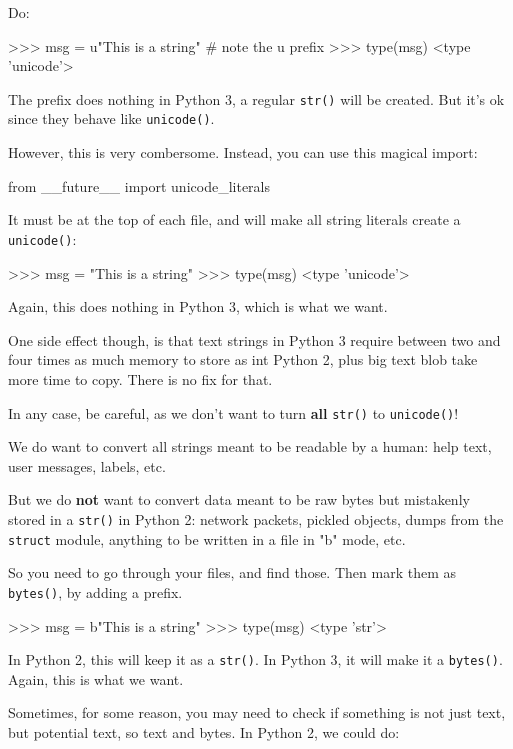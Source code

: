 Do:

\begin{py2}
>>> msg = u"This is a string" # note the u prefix
>>> type(msg)
<type 'unicode'>
\end{py2}

The  prefix does nothing in Python 3, a regular \lstinline{str()} will be created. But it's ok since they behave like \lstinline{unicode()}.

However, this is very combersome. Instead, you can use this magical import:

\begin{py2}
from __future__ import unicode_literals
\end{py2}

It must be at the top of each file, and will make all string literals create a \lstinline{unicode()}:

\begin{py2}
>>> msg = "This is a string"
>>> type(msg)
<type 'unicode'>
\end{py2}

Again, this does nothing in Python 3, which is what we want.

One side effect though, is that text strings in Python 3 require between two and four times as much memory to store as int Python 2, plus big text blob take more time to copy. There is no fix for that.

In any case, be careful, as we don't want to turn  \textbf{all} \lstinline{str()} to \lstinline{unicode()}!

We do want to convert all strings meant to be readable by a human: help text, user messages, labels, etc.

But we do \textbf{not} want to convert data meant to be raw bytes but mistakenly stored in a \lstinline{str()} in Python 2: network packets, pickled objects, dumps from the \lstinline{struct} module, anything to be written in a file in "b" mode, etc.

So you need to go through your files, and find those. Then mark them as \lstinline{bytes()}, by adding a  prefix.

\begin{py2}
>>> msg = b"This is a string"
>>> type(msg)
<type 'str'>
\end{py2}

In Python 2, this will keep it as a \lstinline{str()}. In Python 3, it will make it a \lstinline{bytes()}. Again, this is what we want.

Sometimes, for some reason, you may need to check if something is not just text, but potential text, so text and bytes. In Python 2, we could do:

